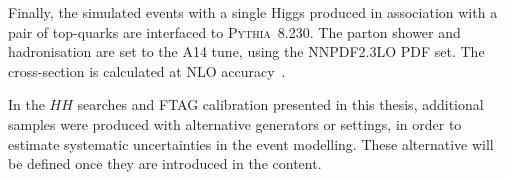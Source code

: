 Finally, the simulated events with a single Higgs produced in association with 
a pair of top-quarks are interfaced to \textsc{Pythia~8.230}.
The parton shower and hadronisation are set to the 
A14 tune, using the \textsc{NNPDF2.3LO} PDF set.
The cross-section is calculated at NLO accuracy~\cite{deFlorian:2016spz}.

In the $HH$ searches and FTAG calibration presented in this thesis, 
additional samples were produced with alternative generators or settings,
in order to estimate systematic uncertainties in the event modelling.
These alternative will be defined once they are introduced in the content. 
